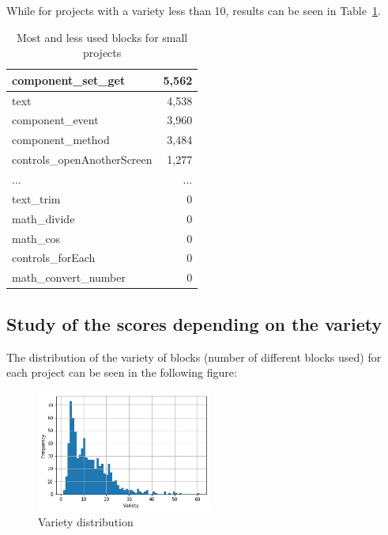 \documentclass[a4paper]{article}
\begin{document}
While for projects with a variety less than 10, results can be seen in Table~\ref{tab:most-least-small}. 

\begin{table}[ht]
\begin{center}
\caption{Most and less used blocks for small projects}

\bigskip
\label{tab:most-least-small}
\begin{tabular}{|l|r|}
\hline
component\_set\_get & 5,562\\ \hline
text & 4,538\\ \hline
component\_event & 3,960\\ \hline
component\_method & 3,484\\ \hline
controls\_openAnotherScreen & 1,277\\ \hline
... & ... \\ \hline
text\_trim & 0\\ \hline
math\_divide & 0\\ \hline
math\_cos & 0\\ \hline
controls\_forEach & 0\\ \hline
math\_convert\_number & 0\\ \hline
\end{tabular}
\end{center}
\end{table}


\subsection{Study of the scores depending on the variety}

The distribution of the variety of blocks (number of different blocks used) for each project can be seen in the following figure:

\begin{figure}[ht]
\begin{center}
\includegraphics[height=4cm]{fig1}
\caption{Variety distribution }
\label{fig1}
\end{center}
\end{figure}
\end{document}
